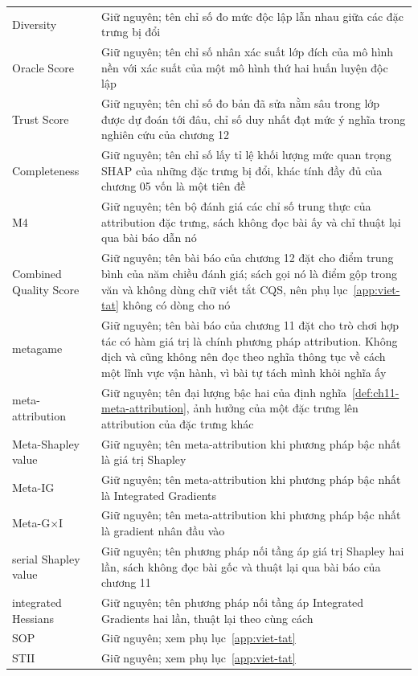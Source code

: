 \begin{longtable}{@{}lp{7cm}@{}}
Diversity & Giữ nguyên; tên chỉ số đo mức độc lập lẫn nhau giữa các đặc trưng bị đổi \\
Oracle Score & Giữ nguyên; tên chỉ số nhân xác suất lớp đích của mô hình nền với xác suất của một mô hình thứ hai huấn luyện độc lập \\
Trust Score & Giữ nguyên; tên chỉ số đo bản đã sửa nằm sâu trong lớp được dự đoán tới đâu, chỉ số duy nhất đạt mức ý nghĩa trong nghiên cứu của chương 12 \\
Completeness & Giữ nguyên; tên chỉ số lấy tỉ lệ khối lượng mức quan trọng SHAP của những đặc trưng bị đổi, khác tính đầy đủ của chương 05 vốn là một tiên đề \\
M4 & Giữ nguyên; tên bộ đánh giá các chỉ số trung thực của attribution đặc trưng, sách không đọc bài ấy và chỉ thuật lại qua bài báo dẫn nó \\
Combined Quality Score & Giữ nguyên; tên bài báo của chương 12 đặt cho điểm trung bình của năm chiều đánh giá; sách gọi nó là điểm gộp trong văn và không dùng chữ viết tắt CQS, nên phụ lục~\ref{app:viet-tat} không có dòng cho nó \\
metagame & Giữ nguyên; tên bài báo của chương 11 đặt cho trò chơi hợp tác có hàm giá trị là chính phương pháp attribution. Không dịch và cũng không nên đọc theo nghĩa thông tục về cách một lĩnh vực vận hành, vì bài tự tách mình khỏi nghĩa ấy \\
meta-attribution & Giữ nguyên; tên đại lượng bậc hai của định nghĩa~\ref{def:ch11-meta-attribution}, ảnh hưởng của một đặc trưng lên attribution của đặc trưng khác \\
Meta-Shapley value & Giữ nguyên; tên meta-attribution khi phương pháp bậc nhất là giá trị Shapley \\
Meta-IG & Giữ nguyên; tên meta-attribution khi phương pháp bậc nhất là Integrated Gradients \\
Meta-G$\times$I & Giữ nguyên; tên meta-attribution khi phương pháp bậc nhất là gradient nhân đầu vào \\
serial Shapley value & Giữ nguyên; tên phương pháp nối tầng áp giá trị Shapley hai lần, sách không đọc bài gốc và thuật lại qua bài báo của chương 11 \\
integrated Hessians & Giữ nguyên; tên phương pháp nối tầng áp Integrated Gradients hai lần, thuật lại theo cùng cách \\
SOP & Giữ nguyên; xem phụ lục~\ref{app:viet-tat} \\
STII & Giữ nguyên; xem phụ lục~\ref{app:viet-tat} \\

\end{longtable}
